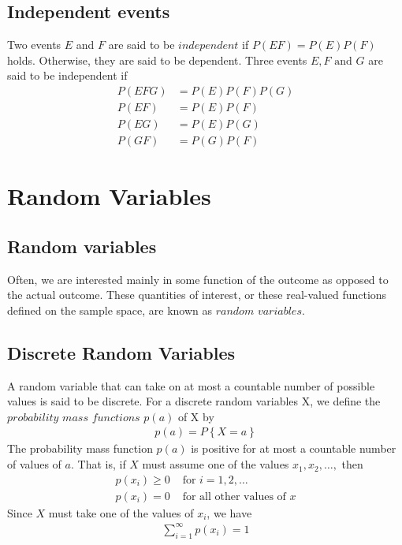 \documentclass[a4paper]{article}
\begin{document}
\subsection{Independent events} %
\label{sub:Independent events}
Two events $E$ and $F$ are said to be $independent$ if $P(EF)=P(E)P(F)$ holds. Otherwise, they are said to be dependent.
Three events $E,F \text{ and } G$ are said to be independent if
\begin{align}
  P(EFG) & =P(E)P(F)P(G) \\
  P(EF) & =P(E)P(F) \\
  P(EG) & =P(E)P(G) \\
  P(GF) & =P(G)P(F) 
\end{align}
\section{Random Variables} %
\label{sec:Random Variables}
\subsection{Random variables} %
\label{sub:Random variables}
Often, we are interested mainly in some function of the outcome as opposed to the actual outcome. These quantities of interest,
or these real-valued functions defined on the sample space, are known as $random$ $variables$. 
\subsection{Discrete Random Variables} %
\label{sub:Discrete Random Variables}
A random variable that can take on at most a countable number of possible values is said to be discrete. For a discrete random
variables X, we define the $probability$ $mass$ $functions$ $p(a)$ of X by
\begin{align}
  p(a)=P\left\{ X=a \right\} 
\end{align}
The probability mass function $p(a)$ is positive for at most a countable number of values of $a$. That is, if $X$ must assume
one of the values $x_1,x_2, \dots,$ then
\begin{align}
  p(x_i) \geq 0 & \text{    for } i=1,2,\dots \\
  p(x_i) =0 & \text{    for all other values of }x 
\end{align}
Since $X$ must take one of the values of $x_i$, we have
\begin{align}
  \sum_{i=1}^\infty p(x_i)=1 
\end{align}
\end{document}
